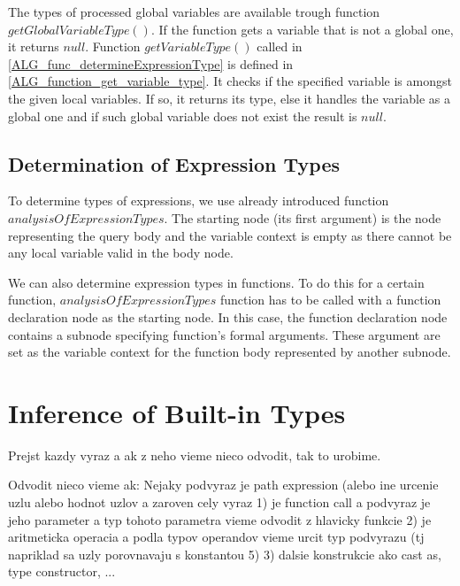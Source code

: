 The types of processed global variables are available trough function $getGlobalVariableType()$. If the function gets a variable that is not a global one, it returns $null$. Function $getVariableType()$ called in \ref{ALG_func_determineExpressionType} is defined in \ref{ALG_function_get_variable_type}. It checks if the specified variable is amongst the given local variables. If so, it returns its type, else it handles the variable as a global one and if such global variable does not exist the result is $null$.

\subsection{Determination of Expression Types}
To determine types of expressions, we use already introduced function $analysisOfExpressionTypes$. The starting node (its first argument) is the node representing the query body and the variable context is empty as there cannot be any local variable valid in the body node.

We can also determine expression types in functions. To do this for a certain function, $analysisOfExpressionTypes$ function has to be called with a function declaration node as the starting node. In this case, the function declaration node contains a subnode specifying function's formal arguments. These argument are set as the variable context for the function body represented by another subnode.































\section{Inference of Built-in Types}
Prejst kazdy vyraz a ak z neho vieme nieco odvodit, tak to urobime.

Odvodit nieco vieme ak:
Nejaky podvyraz je path expression (alebo ine urcenie uzlu alebo hodnot uzlov 
a zaroven cely vyraz
1) je function call a podvyraz je jeho parameter a typ tohoto parametra vieme odvodit z hlavicky funkcie
2) je aritmeticka operacia a podla typov operandov vieme urcit typ podvyrazu (tj napriklad sa uzly porovnavaju s konstantou 5) 
3) dalsie konstrukcie ako cast as, type constructor, ... 



